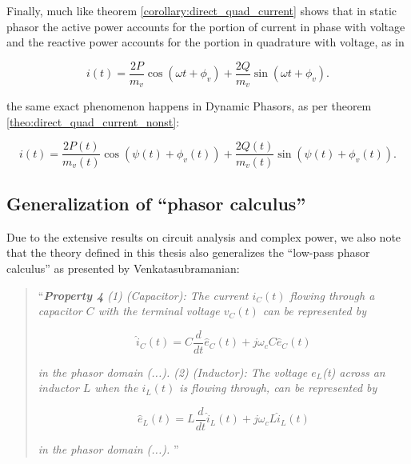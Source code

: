 	Finally, much like theorem \ref{corollary:direct_quad_current} shows that in static phasor the active power accounts for the portion of current in  phase with voltage and the reactive power accounts for the portion in quadrature with voltage, as in

\begin{equation} i(t) = \dfrac{2P}{m_v}\cos\left(\omega t + \phi_v\right) + \dfrac{2Q}{m_v}\sin\left(\omega t + \phi_v\right) .\end{equation}

	\noindent the same exact phenomenon happens in Dynamic Phasors, as per theorem \ref{theo:direct_quad_current_nonst}:

\begin{equation} i(t) = \dfrac{2P(t)}{m_v(t)}\cos\left(\psi(t) + \phi_v(t)\right) + \dfrac{2Q(t)}{m_v(t)}\sin\left(\psi(t) + \phi_v(t)\right) .\end{equation}

\subsection{Generalization of ``phasor calculus''} %

	Due to the extensive results on circuit analysis and complex power, we also note that the theory defined in this thesis also generalizes the ``low-pass phasor calculus'' as presented by Venkatasubramanian:

\begin{quotation}
	``\textit{\textbf{Property 4} (1) (Capacitor): The current $i_C(t)$ flowing through a capacitor $C$ with the terminal voltage $v_C(t)$ can be represented by}

\begin{equation} \hat{i}_C(t) = C\dfrac{d}{dt}\hat{e}_C(t) + j\omega_c C\hat{e}_C(t) \end{equation}

	\noindent \textit{in the phasor domain (...). (2) (Inductor): The voltage $e_L$(t) across an inductor $L$ when the $i_L(t)$ is flowing through, can be represented by}

\begin{equation} \hat{e}_L(t) = L\dfrac{d}{dt}\hat{i}_L(t) + j\omega_c L\hat{i}_L(t) \end{equation}

 	\noindent \textit{in the phasor domain (...).} ''\hfill\cite{Venkatasubramanian1994}
\end{quotation}

